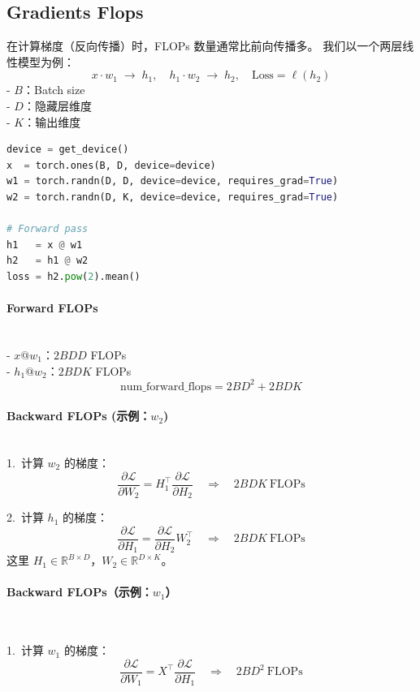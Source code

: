 \clearpage
\subsection{Gradients Flops}
在计算梯度（反向传播）时，FLOPs 数量通常比前向传播多。  
我们以一个两层线性模型为例：  
\[
x \cdot w_1 \;\rightarrow\; h_1,\quad
h_1 \cdot w_2 \;\rightarrow\; h_2,\quad
\mathrm{Loss} = \ell(h_2)
\]
- $B$：Batch size\\
- $D$：隐藏层维度\\
- $K$：输出维度

\begin{lstlisting}[language=Python]
device = get_device()
x  = torch.ones(B, D, device=device)
w1 = torch.randn(D, D, device=device, requires_grad=True)
w2 = torch.randn(D, K, device=device, requires_grad=True)

# Forward pass
h1   = x @ w1
h2   = h1 @ w2
loss = h2.pow(2).mean()
\end{lstlisting}

\paragraph{Forward FLOPs}~{}
\\
- $x @ w_1$：$2 B D D$ FLOPs \\
- $h_1 @ w_2$：$2 B D K$ FLOPs \\
\[
\text{num\_forward\_flops} = 2BD^2 + 2BDK
\]

\paragraph{Backward FLOPs (示例：$w_2$)}~{}
\\
1.~计算 $w_2$ 的梯度：
\[
\frac{\partial \mathcal{L}}{\partial W_2}
= H_1^\top \frac{\partial \mathcal{L}}{\partial H_2}
\quad\Rightarrow\quad 2 B D K \ \text{FLOPs}
\]

2.~计算 $h_1$ 的梯度：
\[
\frac{\partial \mathcal{L}}{\partial H_1}
= \frac{\partial \mathcal{L}}{\partial H_2} W_2^\top
\quad\Rightarrow\quad 2 B D K \ \text{FLOPs}
\]
这里 $H_1 \in \mathbb{R}^{B \times D}$，$W_2 \in \mathbb{R}^{D \times K}$。



\paragraph{Backward FLOPs（示例：$w_1$）}~{}

1.~计算 $w_1$ 的梯度：
\[
\frac{\partial \mathcal{L}}{\partial W_1}
= X^\top \frac{\partial \mathcal{L}}{\partial H_1}
\quad\Rightarrow\quad 2 B D^2 \ \text{FLOPs}
\]

